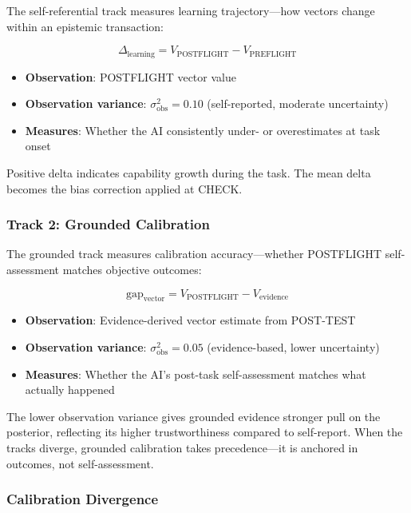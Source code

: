 The self-referential track measures learning trajectory---how vectors change within an epistemic transaction:

\begin{equation}
\Delta_{\text{learning}} = V_{\text{POSTFLIGHT}} - V_{\text{PREFLIGHT}}
\end{equation}

\begin{itemize}
    \item \textbf{Observation}: POSTFLIGHT vector value
    \item \textbf{Observation variance}: $\sigma^2_{\text{obs}} = 0.10$ (self-reported, moderate uncertainty)
    \item \textbf{Measures}: Whether the AI consistently under- or overestimates at task onset
\end{itemize}

Positive delta indicates capability growth during the task. The mean delta becomes the bias correction applied at CHECK.

\subsubsection{Track 2: Grounded Calibration}

The grounded track measures calibration accuracy---whether POSTFLIGHT self-assessment matches objective outcomes:

\begin{equation}
\text{gap}_{\text{vector}} = V_{\text{POSTFLIGHT}} - V_{\text{evidence}}
\end{equation}

\begin{itemize}
    \item \textbf{Observation}: Evidence-derived vector estimate from POST-TEST
    \item \textbf{Observation variance}: $\sigma^2_{\text{obs}} = 0.05$ (evidence-based, lower uncertainty)
    \item \textbf{Measures}: Whether the AI's post-task self-assessment matches what actually happened
\end{itemize}

The lower observation variance gives grounded evidence stronger pull on the posterior, reflecting its higher trustworthiness compared to self-report. When the tracks diverge, grounded calibration takes precedence---it is anchored in outcomes, not self-assessment.

\subsubsection{Calibration Divergence}

